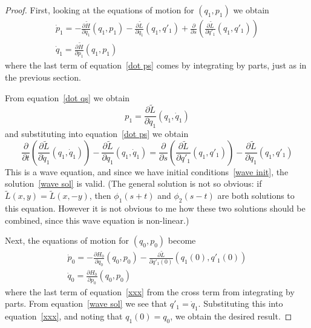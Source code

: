 \documentclass{amsart}
\begin{document}
\begin{proof}
First, looking at the equations of motion for $(q_1,p_1)$ we obtain
\begin{gather}
\label{dot ps}
\dot p_1 = - \frac{\partial \tilde H}{\partial q_1}(q_1,p_1) - \frac{\partial \tilde L}{\partial q_1}(q_1,q'_1) + \frac \partial{\partial s}\left(\frac{\partial \tilde L}{\partial q'_1}(q_1,q'_1)\right) \\
\label{dot qs}
\dot q_1 = \frac{\partial \tilde H}{\partial p_1}(q_1,p_1)
\end{gather}
where the last term of equation~\eqref{dot ps} comes by integrating by parts, just as in the previous section.

From equation~\eqref{dot qs} we obtain
\begin{equation}
p_1 = \frac{\partial \tilde L}{\partial \dot q_1}(q_1,\dot q_1)
\end{equation}
and substituting into equation~\eqref{dot ps} we obtain
\begin{equation}
\label{wave}
\frac \partial{\partial t}\left(\frac{\partial \tilde L}{\partial \dot q_1}(q_1,\dot q_1)\right) - \frac{\partial \tilde L}{\partial q_1}(q_1,\dot q_1) = \frac \partial{\partial s}\left(\frac{\partial \tilde L}{\partial q'_1}(q_1,q'_1)\right) - \frac{\partial \tilde L}{\partial q_1}(q_1,q'_1)
\end{equation}
This is a wave equation, and since we have initial conditions~\eqref{wave init}, the solution~\eqref{wave sol} is valid.  (The general solution is not so obvious: if $\tilde L(x,y) = \tilde L(x,-y)$, then $\phi_1(s+t)$ and $\phi_2(s-t)$ are both solutions to this equation.  However it is not obvious to me how these two solutions should be combined, since this wave equation is non-linear.)

Next, the equations of motion for $(q_0,p_0)$ become
\begin{gather}
\label{xxx}
\dot p_0 = - \frac{\partial H_0}{\partial q_0}(q_0,p_0) - \frac{\partial \tilde L}{\partial q'_1(0)}(q_1(0),q'_1(0)) \\
\dot q_0 = \frac{\partial H_0}{\partial p_0}(q_0,p_0)
\end{gather}
where the last term of equation~\eqref{xxx} from the cross term from integrating by parts.  From equation~\eqref{wave sol} we see that $q'_1 = \dot q_1$.  Substituting this into equation~\eqref{xxx}, and noting that $q_1(0) = q_0$, we obtain the desired result.
\end{proof}
\end{document}
